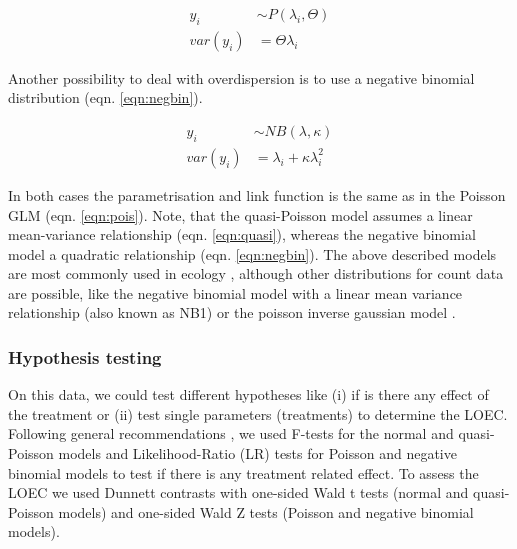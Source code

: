 \documentclass{scrartcl}
\begin{document}
\begin{align}
  y_i &\sim P(\lambda_i, \Theta) \label{eqn:quasi} \\
  var(y_i) &= \Theta \lambda_i  \nonumber
\end{align}

Another possibility to deal with overdispersion is to use a negative binomial distribution (eqn. \ref{eqn:negbin}).

\begin{align}
  y_i &\sim NB(\lambda, \kappa) \label{eqn:negbin}  \\
  var(y_i) &= \lambda_i + \kappa \lambda_i^2 \nonumber
\end{align}

In both cases the parametrisation and link function is the same as in the Poisson GLM (eqn. \ref{eqn:pois}).
Note, that the quasi-Poisson model assumes a linear mean-variance relationship (eqn. \ref{eqn:quasi}), whereas the negative binomial model a quadratic relationship (eqn. \ref{eqn:negbin}).
The above described models are most commonly used in ecology \citep{ver_hoef_quasi-poisson_2007}, although other distributions for count data are possible, like the negative binomial model with a linear mean variance relationship (also known as NB1) or the poisson inverse gaussian model \citep{hilbe_modeling_2014}.


\subsubsection{Hypothesis testing}
On this data, we could test different hypotheses like (i) if is there any effect of the treatment or (ii) test single parameters (treatments) to determine the LOEC.
Following general recommendations \citep{bolker_generalized_2009}, we used F-tests for the normal and quasi-Poisson models and Likelihood-Ratio (LR) tests for Poisson and negative binomial models to test if there is any treatment related effect.
To assess the LOEC we used Dunnett contrasts with one-sided Wald t tests (normal and quasi-Poisson models) and one-sided Wald Z tests (Poisson and negative binomial models).
\end{document}
